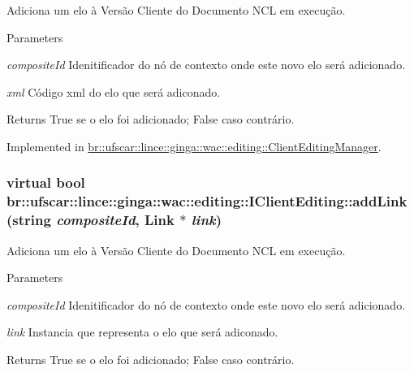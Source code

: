 Adiciona um elo à Versão Cliente do Documento NCL em execução. 


\begin{DoxyParams}{Parameters}
\item[{\em compositeId}]Idenitificador do nó de contexto onde este novo elo será adicionado. \item[{\em xml}]Código xml do elo que será adiconado. \end{DoxyParams}
\begin{DoxyReturn}{Returns}
True se o elo foi adicionado; False caso contrário. 
\end{DoxyReturn}


Implemented in \hyperlink{classbr_1_1ufscar_1_1lince_1_1ginga_1_1wac_1_1editing_1_1ClientEditingManager_a88c07d75d150d08724ec077fa54f2aeb}{br::ufscar::lince::ginga::wac::editing::ClientEditingManager}.

\hypertarget{classbr_1_1ufscar_1_1lince_1_1ginga_1_1wac_1_1editing_1_1IClientEditing_a74829dbd18d200ef2522a0e228e20a10}{
\subsubsection[{addLink}]{\setlength{\rightskip}{0pt plus 5cm}virtual bool br::ufscar::lince::ginga::wac::editing::IClientEditing::addLink (string {\em compositeId}, \/  Link $\ast$ {\em link})}}
\label{classbr_1_1ufscar_1_1lince_1_1ginga_1_1wac_1_1editing_1_1IClientEditing_a74829dbd18d200ef2522a0e228e20a10}


Adiciona um elo à Versão Cliente do Documento NCL em execução. 


\begin{DoxyParams}{Parameters}
\item[{\em compositeId}]Idenitificador do nó de contexto onde este novo elo será adicionado. \item[{\em link}]Instancia que representa o elo que será adiconado. \end{DoxyParams}
\begin{DoxyReturn}{Returns}
True se o elo foi adicionado; False caso contrário. 
\end{DoxyReturn}


